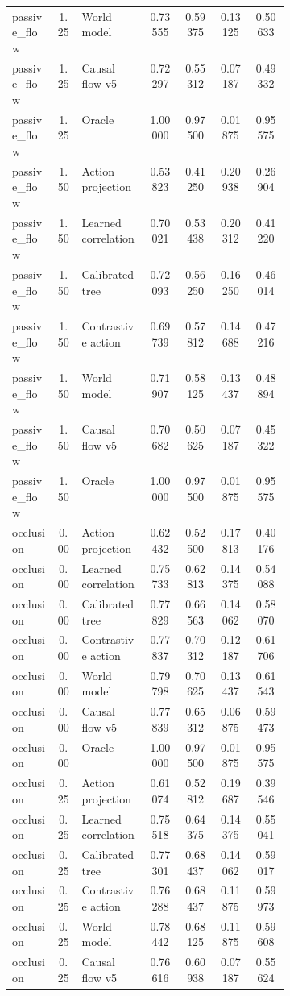 \documentclass{article}
\begin{document}
\begin{center}
\begin{longtable}{p{0.16\linewidth}cp{0.24\linewidth}cccc}
passive\_flow & 1.25 & World model & 0.73555 & 0.59375 & 0.13125 & 0.50633\\
passive\_flow & 1.25 & Causal flow v5 & 0.72297 & 0.55312 & 0.07187 & 0.49332\\
passive\_flow & 1.25 & Oracle & 1.00000 & 0.97500 & 0.01875 & 0.95575\\
passive\_flow & 1.50 & Action projection & 0.53823 & 0.41250 & 0.20938 & 0.26904\\
passive\_flow & 1.50 & Learned correlation & 0.70021 & 0.53438 & 0.20312 & 0.41220\\
passive\_flow & 1.50 & Calibrated tree & 0.72093 & 0.56250 & 0.16250 & 0.46014\\
passive\_flow & 1.50 & Contrastive action & 0.69739 & 0.57812 & 0.14688 & 0.47216\\
passive\_flow & 1.50 & World model & 0.71907 & 0.58125 & 0.13437 & 0.48894\\
passive\_flow & 1.50 & Causal flow v5 & 0.70682 & 0.50625 & 0.07187 & 0.45322\\
passive\_flow & 1.50 & Oracle & 1.00000 & 0.97500 & 0.01875 & 0.95575\\
occlusion & 0.00 & Action projection & 0.62432 & 0.52500 & 0.17813 & 0.40176\\
occlusion & 0.00 & Learned correlation & 0.75733 & 0.62813 & 0.14375 & 0.54088\\
occlusion & 0.00 & Calibrated tree & 0.77829 & 0.66563 & 0.14062 & 0.58070\\
occlusion & 0.00 & Contrastive action & 0.77837 & 0.70312 & 0.12187 & 0.61706\\
occlusion & 0.00 & World model & 0.79798 & 0.70625 & 0.13437 & 0.61543\\
occlusion & 0.00 & Causal flow v5 & 0.77839 & 0.65312 & 0.06875 & 0.59473\\
occlusion & 0.00 & Oracle & 1.00000 & 0.97500 & 0.01875 & 0.95575\\
occlusion & 0.25 & Action projection & 0.61074 & 0.52812 & 0.19687 & 0.39546\\
occlusion & 0.25 & Learned correlation & 0.75518 & 0.64375 & 0.14375 & 0.55041\\
occlusion & 0.25 & Calibrated tree & 0.77301 & 0.68437 & 0.14062 & 0.59017\\
occlusion & 0.25 & Contrastive action & 0.76288 & 0.68437 & 0.11875 & 0.59973\\
occlusion & 0.25 & World model & 0.78442 & 0.68125 & 0.11875 & 0.59608\\
occlusion & 0.25 & Causal flow v5 & 0.76616 & 0.60938 & 0.07187 & 0.55624\\

\end{longtable}
\end{center}
\end{document}
